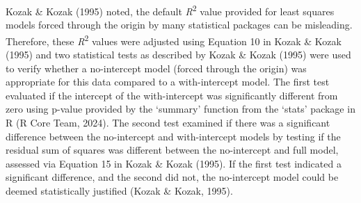 \documentclass[
  letterpaper,
  DIV=11,
  numbers=noendperiod]{scrartcl}
\begin{document}
Kozak \& Kozak (1995) noted, the default \emph{R}\textsuperscript{2}
value provided for least squares models forced through the origin by
many statistical packages can be misleading. Therefore, these
\emph{R}\textsuperscript{2} values were adjusted using Equation 10 in
Kozak \& Kozak (1995) and two statistical tests as described by Kozak \&
Kozak (1995) were used to verify whether a no-intercept model (forced
through the origin) was appropriate for this data compared to a
with-intercept model. The first test evaluated if the intercept of the
with-intercept was significantly different from zero using p-value
provided by the `summary' function from the `stats' package in R (R Core
Team, 2024). The second test examined if there was a significant
difference between the no-intercept and with-intercept models by testing
if the residual sum of squares was different between the no-intercept
and full model, assessed via Equation 15 in Kozak \& Kozak (1995). If
the first test indicated a significant difference, and the second did
not, the no-intercept model could be deemed statistically justified
(Kozak \& Kozak, 1995).
\end{document}
